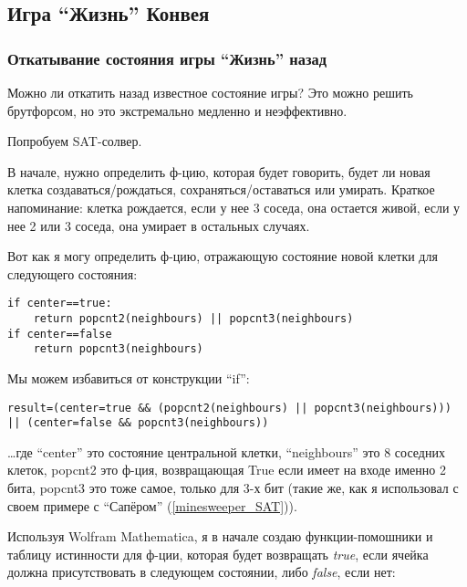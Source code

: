 \subsection{Игра ``Жизнь'' Конвея}

\subsubsection{Откатывание состояния игры ``Жизнь'' назад}

Можно ли откатить назад известное состояние игры?
Это можно решить брутфорсом, но это экстремально медленно и неэффективно.

Попробуем SAT-солвер.

В начале, нужно определить ф-цию, которая будет говорить, будет ли новая клетка создаваться/рождаться, сохраняться/оставаться
или умирать.
Краткое напоминание: клетка рождается, если у нее 3 соседа, она остается живой, если у нее 2 или 3 соседа, она умирает
в остальных случаях.

Вот как я могу определить ф-цию, отражающую состояние новой клетки для следующего состояния:

\begin{lstlisting}
if center==true:
	return popcnt2(neighbours) || popcnt3(neighbours)
if center==false
	return popcnt3(neighbours)
\end{lstlisting}

Мы можем избавиться от конструкции ``if'':

\begin{lstlisting}
result=(center=true && (popcnt2(neighbours) || popcnt3(neighbours))) || (center=false && popcnt3(neighbours))
\end{lstlisting}

\dots где ``center'' это состояние центральной клетки, ``neighbours'' это 8 соседних клеток, popcnt2 это ф-ция,
возвращающая True если имеет на входе именно 2 бита, popcnt3 это тоже самое, только для 3-х бит
(такие же, как я использовал с своем примере с ``Сапёром'' (\ref{minesweeper_SAT})).

Используя Wolfram Mathematica, я в начале создаю функции-помошники и таблицу истинности для ф-ции, которая будет возвращать
\textit{true}, если ячейка должна присутствовать в следующем состоянии, либо \textit{false}, если нет:

